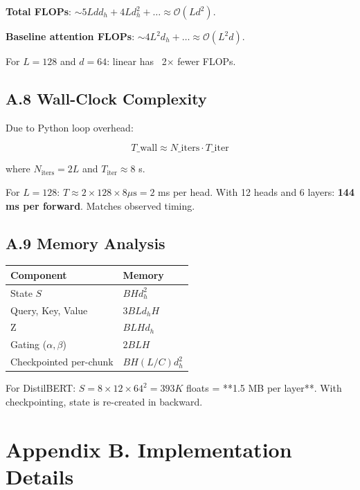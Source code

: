 \textbf{Total FLOPs}: $\sim 5 L d d_h + 4 L d_h^2 + \dots \approx \mathcal{O}(L d^2)$.

\textbf{Baseline attention FLOPs}: $\sim 4 L^2 d_h + \dots \approx \mathcal{O}(L^2 d)$.

For $L = 128$ and $d = 64$: linear has ~2$\times$ fewer FLOPs.

\subsection{A.8 Wall-Clock Complexity}

Due to Python loop overhead:

\[
T\_\text{wall} \approx N\_\text{iters} \cdot T\_\text{iter}
\tag{A.8}
\]

where $N_\text{iters} = 2L$ and $T_\text{iter} \approx 8$  s.

For $L = 128$: $T \approx 2 \times 128 \times 8 \mu\text{s} = 2$ ms per 
head. With 12 heads and 6 layers: \textbf{144 ms per forward}. Matches observed 
timing.

\subsection{A.9 Memory Analysis}

\begin{table}[H]
\centering
\small
\begin{tabular}{ll}
\toprule
\textbf{Component} & \textbf{Memory} \\
\midrule
State $S$ & $B H d_h^2$ \\
Query, Key, Value & $3 B L d_h H$ \\
Z & $B L H d_h$ \\
Gating ($\alpha, \beta$) & $2 B L H$ \\
Checkpointed per-chunk & $B H (L/C) d_h^2$ \\
\bottomrule
\end{tabular}
\end{table}

For DistilBERT: $S = 8 \times 12 \times 64^2 = 393K$ floats = **1.5 MB per 
layer**. With checkpointing, state is re-created in backward.




\section{Appendix B. Implementation Details}

